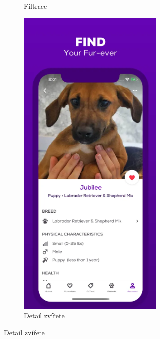 \documentclass[12pt,a4paper]{report}
\begin{document}
\begin{figure}[h!]
\begin{subfigure}{0.22\textwidth}
        \caption{Filtrace} %
        \label{fig:obrazek3}
    \end{subfigure}
    \hfill
    \begin{subfigure}{0.22\textwidth}
        \centering
        \includegraphics[width=\textwidth]{img/petfinder4.png} %
        \caption{Detail zvířete} %
        \label{fig:obrazek4}
    \end{subfigure}
    

\end{figure}
\end{document}
